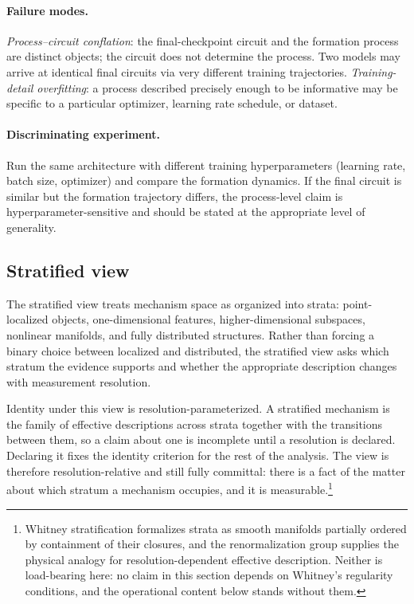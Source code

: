 \documentclass{article}
\begin{document}
\paragraph{Failure modes.}
\emph{Process--circuit conflation}: the final-checkpoint circuit and the
formation process are distinct objects; the circuit does not determine
the process.  Two models may arrive at identical final circuits via very
different training trajectories.  \emph{Training-detail overfitting}: a
process described precisely enough to be informative may be specific to
a particular optimizer, learning rate schedule, or dataset.

\paragraph{Discriminating experiment.}
Run the same architecture with different training hyperparameters (learning
rate, batch size, optimizer) and compare the formation dynamics.  If the
final circuit is similar but the formation trajectory differs, the
process-level claim is hyperparameter-sensitive and should be stated at
the appropriate level of generality.

\subsection{Stratified view}

The stratified view treats mechanism space as organized into strata:
point-localized objects, one-dimensional features, higher-dimensional
subspaces, nonlinear manifolds, and fully distributed structures.  Rather
than forcing a binary choice between localized and distributed, the
stratified view asks which stratum the evidence supports and whether the
appropriate description changes with measurement resolution.


Identity under this view is resolution-parameterized.  A stratified
mechanism is the family of effective descriptions across strata together
with the transitions between them, so a claim about one is incomplete
until a resolution is declared.  Declaring it fixes the identity
criterion for the rest of the analysis.  The view is therefore
resolution-relative and still fully committal: there is a fact of the
matter about which stratum a mechanism occupies, and it is
measurable.\footnote{Whitney stratification
\citep{whitney1965,golubitsky1973} formalizes strata as smooth manifolds
partially ordered by containment of their closures, and the
renormalization group \citep{wilson1971,goldenfeld1992} supplies the
physical analogy for resolution-dependent effective description.
Neither is load-bearing here: no claim in this section depends on
Whitney's regularity conditions, and the operational content below
stands without them.}
\end{document}
